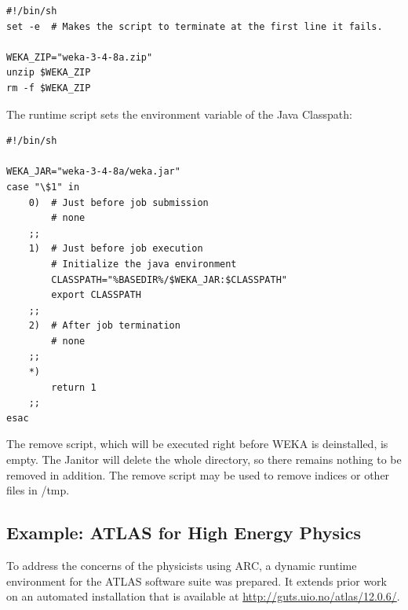 {%
\begin{verbatim} 
#!/bin/sh
set -e  # Makes the script to terminate at the first line it fails.

WEKA_ZIP="weka-3-4-8a.zip"
unzip $WEKA_ZIP
rm -f $WEKA_ZIP
\end{verbatim}
The runtime script sets the environment variable of the Java Classpath:
\begin{verbatim}
#!/bin/sh

WEKA_JAR="weka-3-4-8a/weka.jar"
case "\$1" in
	0)	# Just before job submission
		# none
	;;
	1)	# Just before job execution
		# Initialize the java environment
		CLASSPATH="%BASEDIR%/$WEKA_JAR:$CLASSPATH"
		export CLASSPATH
	;;
	2)	# After job termination
		# none
	;;
	*)
		return 1
	;;
esac	
\end{verbatim}

The remove script, which will be executed right before WEKA is
deinstalled, is empty. The Janitor will delete the whole directory,
so there remains nothing to be removed in addition.
The remove script may \eg be used to remove indices or other files
in /tmp.


\subsection{Example: ATLAS for High Energy Physics}

To address the concerns of the physicists using ARC, a dynamic runtime
environment for the ATLAS software suite was prepared. It extends prior
work on an automated installation that is available at
\href{http://guts.uio.no/atlas/12.0.6/}{http://guts.uio.no/atlas/12.0.6/}.

}
